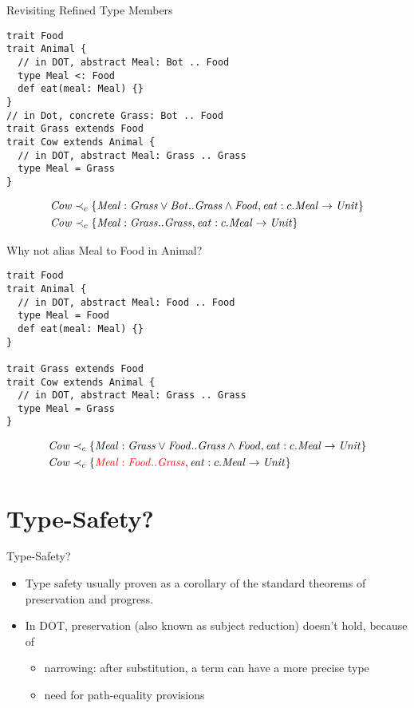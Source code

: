 \documentclass{beamer}
\begin{document}
\begin{frame}[fragile]{Revisiting Refined Type Members}
\begin{verbatim}
trait Food
trait Animal {
  // in DOT, abstract Meal: Bot .. Food
  type Meal <: Food
  def eat(meal: Meal) {}
}
// in Dot, concrete Grass: Bot .. Food
trait Grass extends Food
trait Cow extends Animal {
  // in DOT, abstract Meal: Grass .. Grass
  type Meal = Grass
}
\end{verbatim}
\begin{align*}
{\mathit{Cow}} &\prec_c \{{\mathit{Meal} : {\mathit{Grass}} \vee {\mathit{Bot}}..{\mathit{Grass}} \wedge {\mathit{Food}}}, {\mathit{eat} : c.\mathit{Meal} \rightarrow \mathit{Unit}}\}\\
{\mathit{Cow}} &\prec_c \{{\mathit{Meal} : {\mathit{Grass}}..{\mathit{Grass}}}, {\mathit{eat} : c.\mathit{Meal} \rightarrow \mathit{Unit}}\}
\end{align*}
\end{frame}

\begin{frame}[fragile]{Why not alias Meal to Food in Animal?}
\begin{verbatim}
trait Food
trait Animal {
  // in DOT, abstract Meal: Food .. Food
  type Meal = Food
  def eat(meal: Meal) {}
}

trait Grass extends Food
trait Cow extends Animal {
  // in DOT, abstract Meal: Grass .. Grass
  type Meal = Grass
}
\end{verbatim}
\begin{align*}
{\mathit{Cow}} &\prec_c \{{\mathit{Meal} : {\mathit{Grass}} \vee {\mathit{Food}}..{\mathit{Grass}} \wedge {\mathit{Food}}}, {\mathit{eat} : c.\mathit{Meal} \rightarrow \mathit{Unit}}\}\\
{\mathit{Cow}} &\prec_c \{{\color{red}{\mathit{Meal} : {\mathit{Food}}..{\mathit{Grass}}}}, {\mathit{eat} : c.\mathit{Meal} \rightarrow \mathit{Unit}}\}
\end{align*}
\end{frame}


\section{Type-Safety?}

\begin{frame}{Type-Safety?}
\begin{itemize}
\item Type safety usually proven as a corollary of the standard theorems of preservation and progress.
\item In DOT, preservation (also known as subject reduction) doesn't hold, because of
\begin{itemize}
\item narrowing: after substitution, a term can have a more precise type
\item need for path-equality provisions
\end{itemize}
\end{itemize}
\end{frame}
\end{document}

